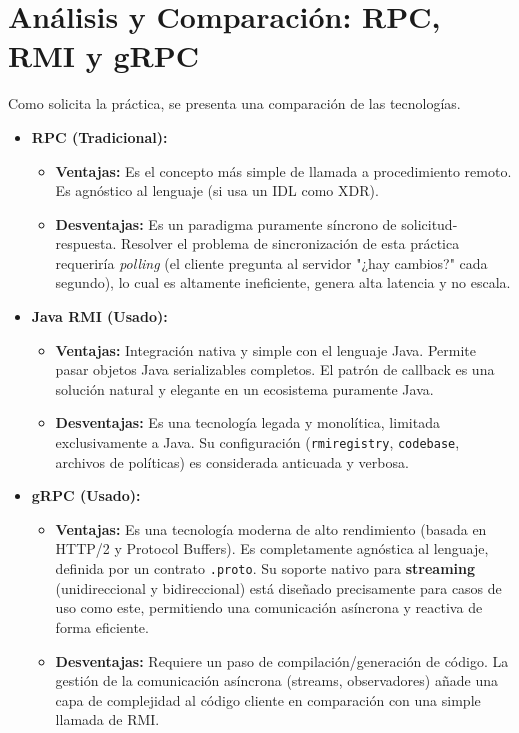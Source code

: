 \documentclass[11pt, a4paper]{article}
\begin{document}
\section{Análisis y Comparación: RPC, RMI y gRPC}
\label{sec:comparacion}

Como solicita la práctica, se presenta una comparación de las tecnologías.

\begin{itemize}
    \item \textbf{RPC (Tradicional):}
    \begin{itemize}
        \item \textbf{Ventajas:} Es el concepto más simple de llamada a procedimiento remoto. Es agnóstico al lenguaje (si usa un IDL como XDR).
        \item \textbf{Desventajas:} Es un paradigma puramente síncrono de solicitud-respuesta. Resolver el problema de sincronización de esta práctica requeriría \textit{polling} (el cliente pregunta al servidor "¿hay cambios?" cada segundo), lo cual es altamente ineficiente, genera alta latencia y no escala.
    \end{itemize}
    
    \item \textbf{Java RMI (Usado):}
    \begin{itemize}
        \item \textbf{Ventajas:} Integración nativa y simple con el lenguaje Java. Permite pasar objetos Java serializables completos. El patrón de callback es una solución natural y elegante en un ecosistema puramente Java.
        \item \textbf{Desventajas:} Es una tecnología legada y monolítica, limitada exclusivamente a Java. Su configuración (\texttt{rmiregistry}, \texttt{codebase}, archivos de políticas) es considerada anticuada y verbosa.
    \end{itemize}
    
    \item \textbf{gRPC (Usado):}
    \begin{itemize}
        \item \textbf{Ventajas:} Es una tecnología moderna de alto rendimiento (basada en HTTP/2 y Protocol Buffers). Es completamente agnóstica al lenguaje, definida por un contrato \texttt{.proto}. Su soporte nativo para \textbf{streaming} (unidireccional y bidireccional) está diseñado precisamente para casos de uso como este, permitiendo una comunicación asíncrona y reactiva de forma eficiente.
        \item \textbf{Desventajas:} Requiere un paso de compilación/generación de código. La gestión de la comunicación asíncrona (streams, observadores) añade una capa de complejidad al código cliente en comparación con una simple llamada de RMI.
    \end{itemize}
\end{itemize}
\end{document}

